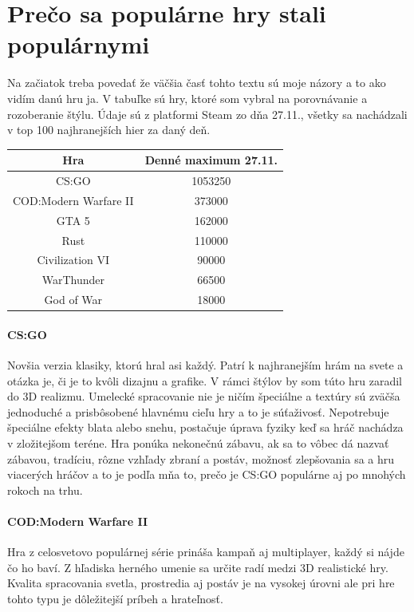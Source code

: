 \documentclass[10pt,twoside,slovak,a4paper]{article}
\begin{document}
\section{Prečo sa populárne hry stali populárnymi}
Na začiatok treba povedať že väčšia časť tohto textu sú moje názory a to ako vidím danú hru ja. V tabuľke sú hry, ktoré som vybral na porovnávanie a rozoberanie štýlu. Údaje sú z platformi Steam zo dňa 27.11., všetky sa nachádzali v top 100 najhranejších hier za daný deň.

\begin{center}
\begin{tabular}{ |c| c| }
\hline
 Hra & Denné maximum 27.11. \\
\hline
 CS:GO & 1053250 \\
\hline
 COD:Modern Warfare II & 373000 \\
\hline
 GTA 5 & 162000 \\
\hline
 Rust & 110000 \\
\hline
 Civilization VI & 90000 \\
\hline
 WarThunder & 66500 \\
\hline
 God of War & 18000 \\
\hline
\end{tabular}
\end{center}

\paragraph{CS:GO}
Novšia verzia klasiky, ktorú hral asi každý. Patrí k najhranejším hrám na svete a otázka je, či je to kvôli dizajnu a grafike. V rámci štýlov by som túto hru zaradil do 3D realizmu. Umelecké spracovanie nie je ničím špeciálne a textúry sú zväčša jednoduché a prisbôsobené hlavnému cieľu hry a to je súťaživosť. Nepotrebuje špeciálne efekty blata alebo snehu, postačuje úprava fyziky keď sa hráč nachádza v zložitejšom teréne. Hra ponúka nekonečnú zábavu, ak sa to vôbec dá nazvať zábavou, tradíciu, rôzne vzhľady zbraní a postáv, možnosť zlepšovania sa a hru viacerých hráčov a to je podľa mňa to, prečo je CS:GO populárne aj po mnohých rokoch na trhu.

\paragraph{COD:Modern Warfare II}
Hra z celosvetovo populárnej série prináša kampaň aj multiplayer, každý si nájde čo ho baví. Z hľadiska herného umenie sa určite radí medzi 3D realistické hry. Kvalita spracovania svetla, prostredia aj postáv je na vysokej úrovni ale pri hre tohto typu je dôležitejší príbeh a hrateľnosť.
\end{document}

